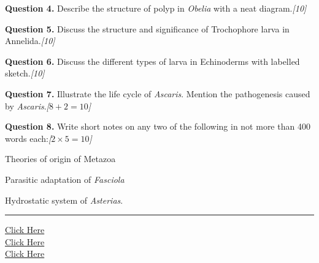\documentclass[11pt,a4paper]{article}
\newcommand{\pts}[1]{\hfill   \textit{[#1]}}
\begin{document}
\medskip


\noindent   \textbf{Question 4.} Describe the structure of polyp in   \textit{Obelia} with a neat diagram.\pts{10}

\medskip


\noindent   \textbf{Question 5.} Discuss the structure and significance of Trochophore larva in Annelida.\pts{10}

\medskip


\noindent   \textbf{Question 6.} Discuss the different types of larva in Echinoderms with labelled sketch.\pts{10}

\medskip


\noindent   \textbf{Question 7.} Illustrate the life cycle of   \textit{Ascaris}. Mention the pathogenesis caused by   \textit{Ascaris}.\pts{$8 + 2 = 10$}

\medskip


\noindent   \textbf{Question 8.} Write short notes on any two of the following in not more than 400 words each:\pts{$2  \times 5 = 10$}

\begin{parts}
  \item Theories of origin of Metazoa
  \item Parasitic adaptation of   \textit{Fasciola}
  \item Hydrostatic system of   \textit{Asterias}.
\end{parts}

\vfill
\rule{\linewidth}{0.4pt}

\begin{center}\small
\href{https://bhu-exam.vercel.app/}{Click Here}\\[4pt]\href{https://me-aryan.vercel.app/}{Click Here}\\[4pt]\href{https://quashan-me.vercel.app/}{Click Here}
\end{center}
\end{document}
